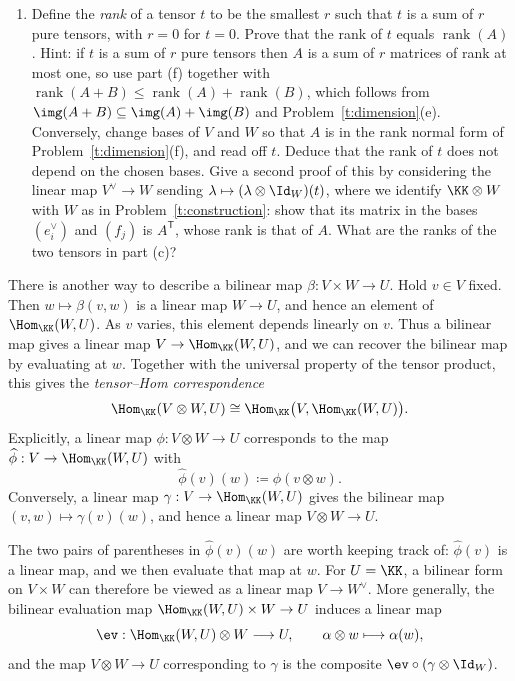 \documentclass[12pt,reqno]{amsart}
\providecommand{\rank}{\operatorname{rank}}
\begin{document}
\begin{problems}
\begin{enumerate}
\item Define the \emph{rank} of a tensor $t$ to be the smallest $r$ such that $t$ is a sum of $r$ pure tensors, with $r=0$ for $t=0$. Prove that the rank of $t$ equals $\rank(A)$. Hint: if $t$ is a sum of $r$ pure tensors then $A$ is a sum of $r$ matrices of rank at most one, so use part (f) together with $\rank(A+B)\leq\rank(A)+\rank(B)$, which follows from $\img(A+B)\subseteq\img(A)+\img(B)$ and Problem~\ref{t:dimension}(e). Conversely, change bases of $V$ and $W$ so that $A$ is in the rank normal form of Problem~\ref{t:dimension}(f), and read off $t$. Deduce that the rank of $t$ does not depend on the chosen bases. Give a second proof of this by considering the linear map $V^{\vee}\to W$ sending $\lambda\mapsto(\lambda\otimes\Id_W)(t)$, where we identify $\KK\otimes W$ with $W$ as in Problem~\ref{t:construction}: show that its matrix in the bases $(e_i^{\vee})$ and $(f_j)$ is $A^{\mathsf T}$, whose rank is that of $A$. What are the ranks of the two tensors in part (c)?
\end{enumerate}
\end{problems}

\hrulefill

There is another way to describe a bilinear map $\beta:V\times W\to U$. Hold $v\in V$ fixed. Then $w\mapsto\beta(v,w)$ is a linear map $W\to U$, and hence an element of $\Hom_{\KK}(W,U)$. As $v$ varies, this element depends linearly on $v$. Thus a bilinear map gives a linear map $V\to\Hom_{\KK}(W,U)$, and we can recover the bilinear map by evaluating at $w$. Together with the universal property of the tensor product, this gives the \emph{tensor--Hom correspondence}
\[
\Hom_{\KK}(V\otimes W,U)\cong\Hom_{\KK}\big(V,\Hom_{\KK}(W,U)\big).
\]
Explicitly, a linear map $\phi:V\otimes W\to U$ corresponds to the map $\widehat\phi:V\to\Hom_{\KK}(W,U)$ with
\[
\widehat\phi(v)(w)\coloneqq\phi(v\otimes w).
\]
Conversely, a linear map $\gamma:V\to\Hom_{\KK}(W,U)$ gives the bilinear map $(v,w)\mapsto\gamma(v)(w)$, and hence a linear map $V\otimes W\to U$.

The two pairs of parentheses in $\widehat\phi(v)(w)$ are worth keeping track of: $\widehat\phi(v)$ is a linear map, and we then evaluate that map at $w$. For $U=\KK$, a bilinear form on $V\times W$ can therefore be viewed as a linear map $V\to W^{\vee}$. More generally, the bilinear evaluation map $\Hom_{\KK}(W,U)\times W\to U$ induces a linear map
\[
\ev:\Hom_{\KK}(W,U)\otimes W\longrightarrow U,\qquad \alpha\otimes w\longmapsto\alpha(w),
\]
and the map $V\otimes W\to U$ corresponding to $\gamma$ is the composite $\ev\circ(\gamma\otimes\Id_W)$.
\end{document}

